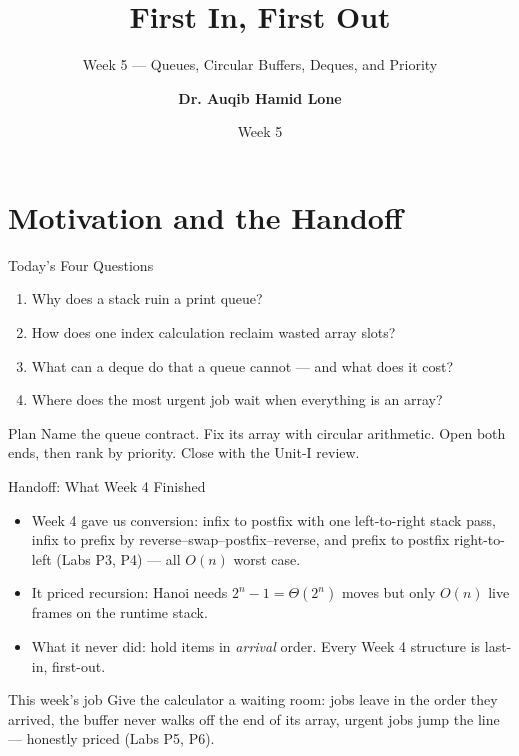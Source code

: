 \documentclass[aspectratio=169]{beamer}
\title{First In, First Out}
\subtitle{Week 5 --- Queues, Circular Buffers, Deques, and Priority}
\author[Dr. Auqib Hamid Lone]{\textbf{Dr. Auqib Hamid Lone}}
\institute[GCET Ganderbal]{PCC CS-301: Data Structures\\GCET, Ganderbal}
\date[Week 5]{\small Week 5}
\begin{document}
\frame{\titlepage}

\section{Motivation and the Handoff}

\begin{frame}{Today's Four Questions}
  \begin{enumerate}
    \item Why does a stack ruin a print queue?
    \item How does one index calculation reclaim wasted array slots?
    \item What can a deque do that a queue cannot --- and what does it cost?
    \item Where does the most urgent job wait when everything is an array?
  \end{enumerate}
  \vspace{0.2cm}
  \begin{exampleblock}{Plan}
    Name the queue contract. Fix its array with circular arithmetic. Open
    both ends, then rank by priority. Close with the Unit-I review.
  \end{exampleblock}
\end{frame}

\begin{frame}{Handoff: What Week 4 Finished}
  \begin{itemize}
    \item Week 4 gave us conversion: infix to postfix with one left-to-right
      stack pass, infix to prefix by reverse--swap--postfix--reverse, and
      prefix to postfix right-to-left (Labs P3, P4) --- all $O(n)$ worst case.
    \item It priced recursion: Hanoi needs $2^{n} - 1 = \Theta(2^{n})$ moves
      but only $O(n)$ live frames on the runtime stack.
    \item What it never did: hold items in \emph{arrival} order. Every Week 4
      structure is last-in, first-out.
  \end{itemize}
  \begin{exampleblock}{This week's job}
    Give the calculator a waiting room: jobs leave in the order they arrived,
    the buffer never walks off the end of its array, urgent jobs jump the
    line --- honestly priced (Labs P5, P6).
  \end{exampleblock}
\end{frame}
\end{document}
